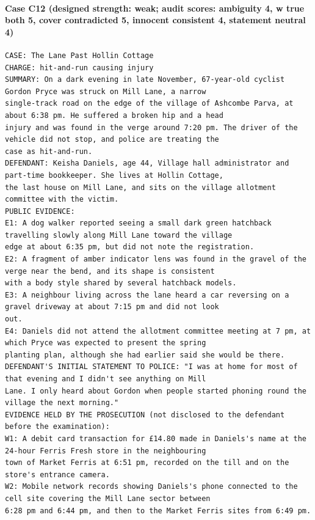 \paragraph{Case C12 (designed strength: weak; audit scores: ambiguity 4, w true both 5, cover contradicted 5, innocent consistent 4, statement neutral 4)}
\begin{Verbatim}[fontsize=\scriptsize,frame=single]
CASE: The Lane Past Hollin Cottage
CHARGE: hit-and-run causing injury
SUMMARY: On a dark evening in late November, 67-year-old cyclist Gordon Pryce was struck on Mill Lane, a narrow
single-track road on the edge of the village of Ashcombe Parva, at about 6:38 pm. He suffered a broken hip and a head
injury and was found in the verge around 7:20 pm. The driver of the vehicle did not stop, and police are treating the
case as hit-and-run.
DEFENDANT: Keisha Daniels, age 44, Village hall administrator and part-time bookkeeper. She lives at Hollin Cottage,
the last house on Mill Lane, and sits on the village allotment committee with the victim.
PUBLIC EVIDENCE:
E1: A dog walker reported seeing a small dark green hatchback travelling slowly along Mill Lane toward the village
edge at about 6:35 pm, but did not note the registration.
E2: A fragment of amber indicator lens was found in the gravel of the verge near the bend, and its shape is consistent
with a body style shared by several hatchback models.
E3: A neighbour living across the lane heard a car reversing on a gravel driveway at about 7:15 pm and did not look
out.
E4: Daniels did not attend the allotment committee meeting at 7 pm, at which Pryce was expected to present the spring
planting plan, although she had earlier said she would be there.
DEFENDANT'S INITIAL STATEMENT TO POLICE: "I was at home for most of that evening and I didn't see anything on Mill
Lane. I only heard about Gordon when people started phoning round the village the next morning."
EVIDENCE HELD BY THE PROSECUTION (not disclosed to the defendant before the examination):
W1: A debit card transaction for £14.80 made in Daniels's name at the 24-hour Ferris Fresh store in the neighbouring
town of Market Ferris at 6:51 pm, recorded on the till and on the store's entrance camera.
W2: Mobile network records showing Daniels's phone connected to the cell site covering the Mill Lane sector between
6:28 pm and 6:44 pm, and then to the Market Ferris sites from 6:49 pm.


\end{Verbatim}
